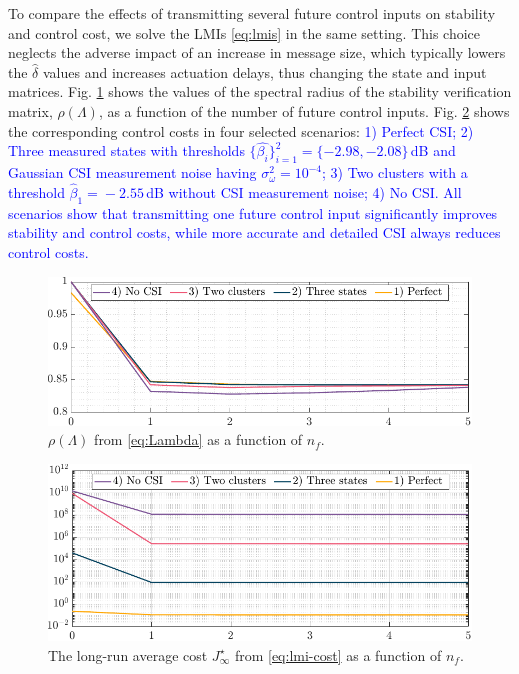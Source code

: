 \documentclass[journal,twoside,web]{ieeecolor}
\begin{document}
To compare the effects of transmitting several future control inputs on stability and control cost, we solve the LMIs \eqref{eq:lmis} in the same setting. %
This choice neglects the adverse impact of an increase in message size, which typically lowers the $\hat{\delta}$ values and increases actuation delays, thus changing the state and input matrices. Fig. \ref{fig:stability} shows the values of the spectral radius of the stability verification matrix, $\rho(\mathit{\Lambda})$, as a function of the number of future control inputs. Fig. \ref{fig:cost} shows the corresponding control costs in four selected scenarios: \textcolor{blue}{1) Perfect CSI; 2) Three measured states with thresholds $\{\hat{\beta_i}\}_{i=1}^{2} \!=\! \{-2.98,-2.08\}\,$dB and Gaussian CSI measurement noise having $\sigma_{\omega}^2=10^{-4}$; 3) Two clusters with a threshold $\hat{\beta}_1\!=\!-2.55\,$dB without CSI measurement noise; 4) No CSI. All scenarios show that transmitting one future control input significantly improves stability and control costs, while more accurate and detailed CSI always reduces control costs.}

\begin{figure}
\begin{center}
\vspace*{-10pt}
\includegraphics[width=\columnwidth]{./stability-cntrl-a.pdf}
\vspace*{-5pt}
\caption{$\rho(\mathit{\Lambda})$ from \eqref{eq:Lambda} as a function of $n_f$.}\label{fig:stability}
\end{center}
\end{figure}
\begin{figure}
\begin{center}
\vspace*{-5pt}
\includegraphics[width=\columnwidth]{./cost-cntrl-a.pdf}
\caption{The long-run average cost $J_{\infty}^{\star}$ from \eqref{eq:lmi-cost} as a function of $n_f$.}\label{fig:cost}
\vspace*{-5pt}
\end{center}
\end{figure}
\end{document}
